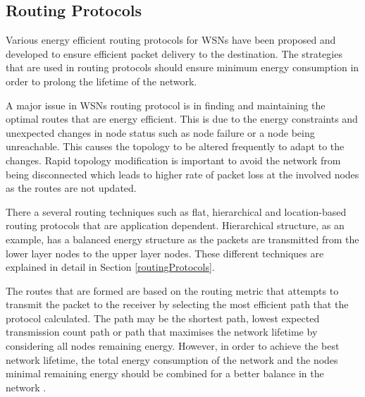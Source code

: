 \subsection{Routing Protocols}
Various energy efficient routing protocols for WSNs have been proposed and developed to ensure efficient packet delivery to the destination. The strategies that are used in routing protocols should ensure minimum energy consumption in order to prolong the lifetime of the network. 

A major issue in WSNs routing protocol is in finding and maintaining the optimal routes that are energy efficient. This is due to the energy constraints and unexpected changes in node status such as node failure or a node being unreachable. This causes the topology to be altered frequently to adapt to the changes. Rapid topology modification is important to avoid the network from being disconnected which leads to higher rate of packet loss at the involved nodes as the routes are not updated.

There a several routing techniques such as flat, hierarchical and location-based routing protocols that are application dependent. Hierarchical structure, as an example, has a balanced energy structure as the packets are transmitted from the lower layer nodes to the upper layer nodes. These different techniques are explained in detail in Section \ref{routingProtocols}. 

The routes that are formed are based on the routing metric \cite{pantazis} that attempts to transmit the packet to the receiver by selecting the most efficient path that the protocol calculated. The path may be the shortest path, lowest expected transmission count path \cite{mrhof} or path that maximises the network lifetime by considering all nodes remaining energy. However, in order to achieve the best network lifetime, the total energy consumption of the network and the nodes minimal remaining energy should be combined for a better balance in the network \cite{erapl}.


